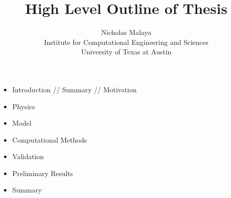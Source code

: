 \documentclass{article}
\title{\bf{High Level Outline of Thesis}}
\author{Nicholas Malaya \\ Institute for Computational Engineering and Sciences \\ University of Texas at Austin} \date{}
\begin{document}
\maketitle

\begin{itemize}
  \item Introduction // Summary // Motivation
  \item Physics
  \item Model
  \item Computational Methods
  \item Validation
  \item Preliminary Results
  \item Summary 
\end{itemize}
\end{document}
